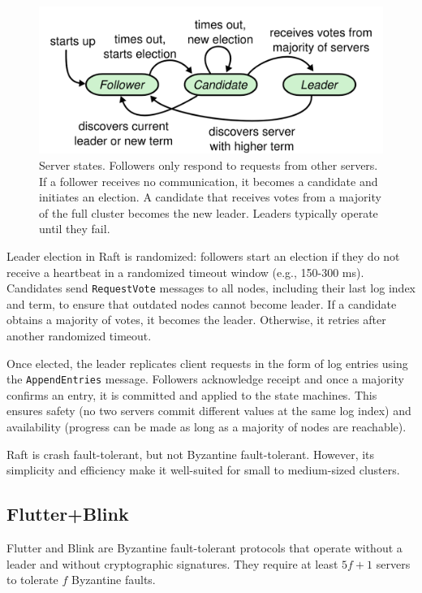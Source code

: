 \begin{figure}
    \centering
    \includegraphics[width=0.7\linewidth]{assets/raft-participants.png}
    \caption{Server states. Followers only respond to requests from other servers. If a follower receives no communication, it becomes a candidate and initiates an election. A candidate that receives votes from a majority of the full cluster becomes the new leader. Leaders typically operate until they fail.}
    \label{fig:raft-participants}
\end{figure}

Leader election in Raft is randomized: followers start an election if they do
not receive a heartbeat in a randomized timeout window (e.g., 150-300 ms).  
Candidates send \texttt{RequestVote} messages to all nodes, including their last log index and term, to ensure that outdated nodes cannot become leader.  
If a candidate obtains a majority of votes, it becomes the leader. Otherwise, it retries after another randomized timeout.  

Once elected, the leader replicates client requests in the form of log entries using the \texttt{AppendEntries} message.  
Followers acknowledge receipt and once a majority confirms an entry, it is committed and applied to the state machines.  
This ensures safety (no two servers commit different values at the same log index) and availability (progress can be made as long as a majority of nodes are reachable).

Raft is crash fault-tolerant, but not Byzantine fault-tolerant. However, its simplicity and efficiency make it well-suited for small to medium-sized clusters.

\subsection{Flutter+Blink}

Flutter and Blink \cite{monti2024fast} are Byzantine fault-tolerant protocols that operate without a leader and without cryptographic signatures.  
They require at least $5f+1$ servers to tolerate $f$ Byzantine faults.  

